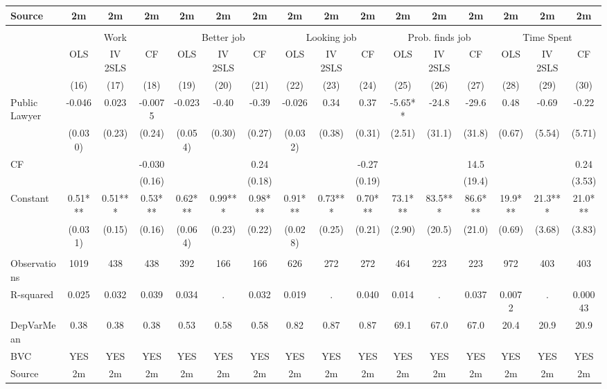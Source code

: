 \begin{tabular}{lccccccccccccccc}
Source & 2m    & 2m    & 2m    & 2m    & 2m    & 2m    & 2m    & 2m    & 2m    & 2m    & 2m    & 2m    & 2m    & 2m    & 2m \\
\midrule
\midrule
      &       &       &       &       &       &       &       &       &       &       &       &       &       &       &  \\
\midrule
      & \multicolumn{3}{c}{Work} & \multicolumn{3}{c}{Better job} & \multicolumn{3}{c}{Looking job} & \multicolumn{3}{c}{Prob. finds job} & \multicolumn{3}{c}{Time Spent} \\
\midrule
\midrule
      & OLS   & IV 2SLS & CF    & OLS   & IV 2SLS & CF    & OLS   & IV 2SLS & CF    & OLS   & IV 2SLS & CF    & OLS   & IV 2SLS & CF \\
\midrule
      & (16)  & (17)  & (18)  & (19)  & (20)  & (21)  & (22)  & (23)  & (24)  & (25)  & (26)  & (27)  & (28)  & (29)  & (30) \\
\midrule
\midrule
Public Lawyer & -0.046 & 0.023 & -0.0075 & -0.023 & -0.40 & -0.39 & -0.026 & 0.34  & 0.37  & -5.65** & -24.8 & -29.6 & 0.48  & -0.69 & -0.22 \\
      & (0.030) & (0.23) & (0.24) & (0.054) & (0.30) & (0.27) & (0.032) & (0.38) & (0.31) & (2.51) & (31.1) & (31.8) & (0.67) & (5.54) & (5.71) \\
CF    &       &       & -0.030 &       &       & 0.24  &       &       & -0.27 &       &       & 14.5  &       &       & 0.24 \\
      &       &       & (0.16) &       &       & (0.18) &       &       & (0.19) &       &       & (19.4) &       &       & (3.53) \\
Constant  & 0.51*** & 0.51*** & 0.53*** & 0.62*** & 0.99*** & 0.98*** & 0.91*** & 0.73*** & 0.70*** & 73.1*** & 83.5*** & 86.6*** & 19.9*** & 21.3*** & 21.0*** \\
      & (0.031) & (0.15) & (0.16) & (0.064) & (0.23) & (0.22) & (0.028) & (0.25) & (0.21) & (2.90) & (20.5) & (21.0) & (0.69) & (3.68) & (3.83) \\
      &       &       &       &       &       &       &       &       &       &       &       &       &       &       &  \\
\midrule
Observations & 1019  & 438   & 438   & 392   & 166   & 166   & 626   & 272   & 272   & 464   & 223   & 223   & 972   & 403   & 403 \\
R-squared & 0.025 & 0.032 & 0.039 & 0.034 & .     & 0.032 & 0.019 & .     & 0.040 & 0.014 & .     & 0.037 & 0.0072 & .     & 0.00043 \\
DepVarMean & 0.38  & 0.38  & 0.38  & 0.53  & 0.58  & 0.58  & 0.82  & 0.87  & 0.87  & 69.1  & 67.0  & 67.0  & 20.4  & 20.9  & 20.9 \\
BVC   & YES   & YES   & YES   & YES   & YES   & YES   & YES   & YES   & YES   & YES   & YES   & YES   & YES   & YES   & YES \\
Source & 2m    & 2m    & 2m    & 2m    & 2m    & 2m    & 2m    & 2m    & 2m    & 2m    & 2m    & 2m    & 2m    & 2m    & 2m \\
\bottomrule
\bottomrule
\end{tabular}%

